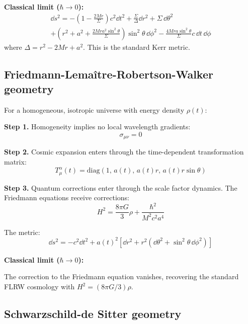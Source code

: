 \documentclass[11pt,a4paper]{article}
\theoremstyle{definition}
\theoremstyle{remark}
\begin{document}
	\textbf{Classical limit ($\hbar \to 0$):}
	\begin{multline}
		\dd s^2 = -\left(1-\frac{2Mr}{\Sigma}\right)c^2 \dd t^2 + \frac{\Sigma}{\Delta}\dd r^2 + \Sigma \, \dd\theta^2 \\
		+ \left(r^2+a^2+\frac{2Mra^2\sin^2\theta}{\Sigma}\right)\sin^2\theta \, \dd\phi^2 - \frac{4Mra\sin^2\theta}{\Sigma} c\,\dd t\,\dd\phi
		\label{eq:kerr_classical}
	\end{multline}
	where $\Delta = r^2 - 2Mr + a^2$. This is the standard Kerr metric.
	
	\subsection{Friedmann-Lemaître-Robertson-Walker geometry}
	
	For a homogeneous, isotropic universe with energy density $\rho(t)$:
	
	\textbf{Step 1.} Homogeneity implies no local wavelength gradients:
	\begin{equation}
		\sigma_{\mu\nu} = 0
		\label{eq:sigma_flrw}
	\end{equation}
	
	\textbf{Step 2.} Cosmic expansion enters through the time-dependent transformation matrix:
	\begin{equation}
		T^\alpha_\mu(t) = \text{diag}\left(1, \, a(t), \, a(t)r, \, a(t)r\sin\theta\right)
		\label{eq:transform_flrw}
	\end{equation}
	
	\textbf{Step 3.} Quantum corrections enter through the scale factor dynamics. The Friedmann equations receive corrections:
	\begin{equation}
		H^2 = \frac{8\pi G}{3}\rho + \frac{\hbar^2}{M^2 c^2 a^4}
		\label{eq:friedmann_qgd}
	\end{equation}
	
	The metric:
	\begin{equation}
		\boxed{\dd s^2 = -c^2 \dd t^2 + a(t)^2\left[\dd r^2 + r^2(\dd\theta^2 + \sin^2\theta \, \dd\phi^2)\right]}
		\label{eq:flrw_metric}
	\end{equation}
	
	\textbf{Classical limit ($\hbar \to 0$):}
	
	The correction to the Friedmann equation vanishes, recovering the standard FLRW cosmology with $H^2 = (8\pi G/3)\rho$.
	
	\subsection{Schwarzschild-de Sitter geometry}
	
\end{document}
